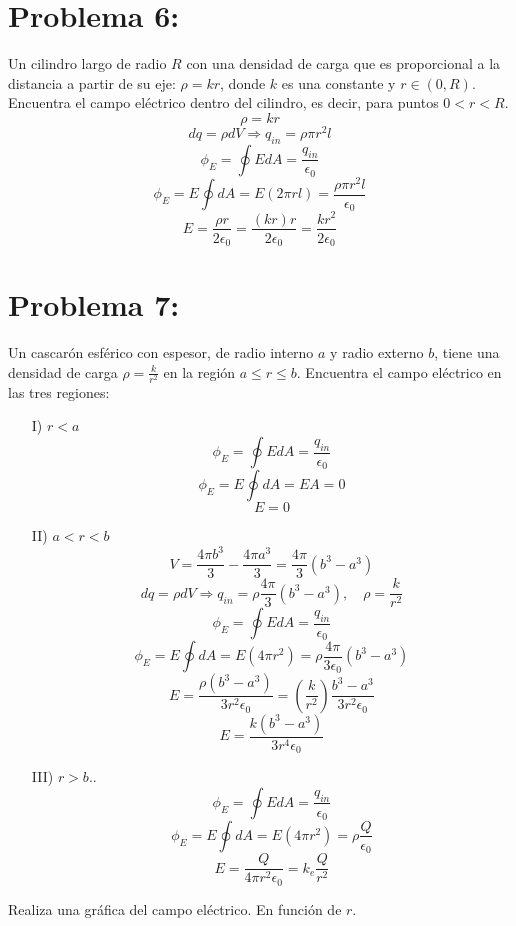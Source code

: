 \documentclass[12pt]{article}
\begin{document}
		\section{Problema 6:}\label{sec:Problema6}
			Un cilindro largo de radio $ R $ con una densidad de carga que es proporcional a la 
			distancia a partir de su eje: $ \rho = kr $, donde $ k $ es una constante y $ r \in (0,R) $. Encuentra 
			el campo eléctrico dentro del cilindro, es decir, para puntos $ 0 < r < R $.
			$$ \rho = kr $$
			$$ dq = \rho dV \Longrightarrow q_{in} = \rho \pi r^2 l $$
			$$ \phi_E = \oint EdA = \frac{q_{in}}{\epsilon_0} $$
			$$ \phi_E = E \oint dA = E(2 \pi r l) = \frac{\rho \pi r^2 l }{\epsilon_0} $$
			$$ E = \frac{\rho r}{2 \epsilon_0} = \frac{(kr) r}{2 \epsilon_0} = \frac{k r^2}{2 \epsilon_0} $$

		\section{Problema 7:}\label{sec:Problema7}
			Un cascarón esférico con espesor, de radio interno $ a $ y radio externo $ b $, tiene una 
			densidad de carga $ \rho = \frac{k}{r^2} $ en la región $ a \leq r \leq b $. Encuentra el campo eléctrico en 
			las tres regiones: 
			\begin{enumerate}
				\item[I)]	 $ r < a $
						 $$ \phi_E = \oint EdA = \frac{q_{in}}{\epsilon_0} $$
						 $$ \phi_E = E \oint dA = EA = 0 $$ 
						 $$ E = 0 $$
				\item[II)] $ a < r < b $
						 $$ V = \frac{4 \pi b^3}{3} - \frac{4 \pi a^3}{3} = \frac{4 \pi}{3}(b^3-a^3) $$
						 $$ dq = \rho dV \Longrightarrow q_{in} = \rho \frac{4 \pi}{3}(b^3-a^3), \quad \rho = \frac{k}{r^2} $$
						 $$ \phi_E = \oint EdA = \frac{q_{in}}{\epsilon_0} $$
						 $$ \phi_E = E \oint dA = E(4 \pi r^2) = \rho \frac{4 \pi}{3 \epsilon_0}(b^3-a^3) $$ 
						 $$ E = \frac{\rho(b^3-a^3)}{3 r^2 \epsilon_0} = \left( \frac{k}{r^2} \right) \frac{b^3-a^3}{3 r^2 \epsilon_0} $$
						 $$ E = \frac{k(b^3-a^3)}{3 r^4 \epsilon_0} $$
				\item[III)]$ r > b $..
						 $$ \phi_E = \oint EdA = \frac{q_{in}}{\epsilon_0} $$
						 $$ \phi_E = E \oint dA = E(4 \pi r^2) = \rho \frac{Q}{\epsilon_0} $$
						 $$ E = \frac{Q}{4 \pi r^2 \epsilon_0} = k_e \frac{Q}{r^2} $$
			\end{enumerate}
			Realiza una gráfica del campo eléctrico. En función de $ r $.
\end{document}
